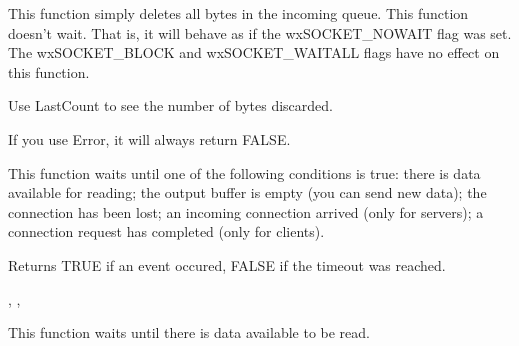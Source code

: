 This function simply deletes all bytes in the incoming queue. This function
doesn't wait. That is, it will behave as if the wxSOCKET\_NOWAIT flag was set. The
wxSOCKET\_BLOCK and wxSOCKET\_WAITALL flags have no effect on this function.

Use LastCount to see the number of bytes discarded.

If you use Error, it will always return FALSE.

\label{wxsocketbasewait}


This function waits until one of the following conditions is true: there
is data available for reading; the output buffer is empty (you can send
new data); the connection has been lost; an incoming connection arrived
(only for servers); a connection request has completed (only for clients).





Returns TRUE if an event occured, FALSE if the timeout was reached.


, 
, 

%
%
\label{wxsocketbasewaitforread}


This function waits until there is data available to be read.




